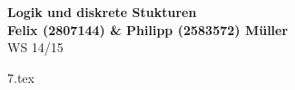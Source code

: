 \documentclass[letterpaper, 12pt, a4paper]{article}
\begin{document}


	\begin{center}
	{\Large{\bfseries{Logik und diskrete Stukturen}}}\\[0.5cm]
	{\large{\bfseries{Felix (2807144) \& Philipp (2583572) Müller}}}\\[0.4cm]
	WS 14/15
	\end{center}


	{7.tex}
\end{document}
